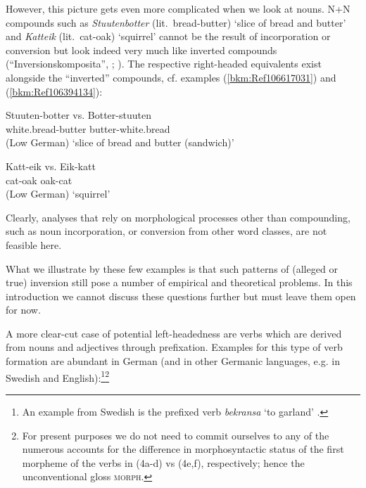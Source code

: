 \documentclass[output=paper
  ,nobabel
  ,draftmode
  ,colorlinks, citecolor=brown
]{langscibook}
\begin{document}
However, this picture gets even more complicated when we look at nouns. N+N compounds such as
\emph{Stuutenbotter} (lit.\ bread-butter) `slice of bread and butter' and \emph{Katteik}
(lit.\ cat-oak) `squirrel' cannot be the result of incorporation or conversion but look indeed very
much like inverted compounds (“Inversionskomposita'', \citealt[61–62]{OrtnerOrtner1984};
\citealt{Olsen2015a}). The respective right-headed equivalents exist alongside the “inverted''
compounds, cf. examples (\ref{bkm:Ref106617031}) and (\ref{bkm:Ref106394134}):

\ea
\label{bkm:Ref106617031}
\gll Stuuten-botter     vs.     Botter-stuuten\\
     white.bread-butter {}  butter-white.bread\\\hfill(Low German)
\glt   `slice of bread and butter (sandwich)'
\z

\ea
\label{bkm:Ref106394134}
\gll   Katt-eik   vs.   Eik-katt\\
       cat-oak    {}   oak-cat \\\hfill(Low German)
\glt   `squirrel'
\z
{}

\noindent
Clearly, analyses that rely on morphological processes other than compounding, such as noun
incorporation, or conversion from other word classes, are not feasible here.

What we illustrate by these few examples is that such patterns of (alleged or true) inversion still
pose a number of empirical and theoretical problems. In this introduction we cannot discuss these
questions further but must leave them open for now.

A more clear-cut case of potential left-headedness are verbs which are derived from nouns and
adjectives through prefixation. Examples for this type of verb formation are abundant in German (and
in other Germanic languages, e.g. in Swedish and English):\footnote{An example from Swedish is the
  prefixed verb \emph{bekransa} `to garland' \citep[90]{Schmidt1996}.}\footnote{For present purposes we do not need to commit ourselves to any of the numerous accounts for the difference in morphosyntactic status of the first morpheme of the verbs in (4a-d) vs (4e,f), respectively; hence the unconventional gloss \textsc{morph}.}
\end{document}
